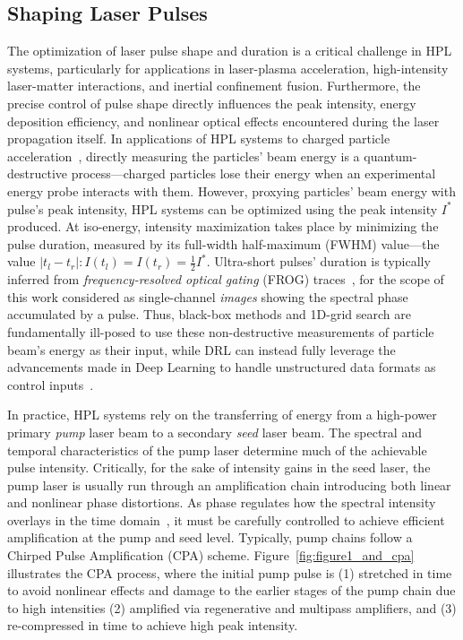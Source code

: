 \subsection{Shaping Laser Pulses}
The optimization of laser pulse shape and duration is a critical challenge in HPL systems, particularly for applications in laser-plasma acceleration, high-intensity laser-matter interactions, and inertial confinement fusion. Furthermore, the precise control of pulse shape directly influences the peak intensity, energy deposition efficiency, and nonlinear optical effects encountered during the laser propagation itself. In applications of HPL systems to charged particle acceleration~\citep{grittani2020device}, directly measuring the particles' beam energy is a quantum-destructive process---charged particles lose their energy when an experimental energy probe interacts with them. 
However, proxying particles' beam energy with pulse's peak intensity, HPL systems can be optimized using the peak intensity $I^*$ produced. At iso-energy, intensity maximization takes place by minimizing the pulse duration, measured by its full-width half-maximum (FWHM) value---the value $\vert t_l - t_r \vert: I(t_l)=I(t_r)= \frac 12 I^*$. Ultra-short pulses' duration is typically inferred from \emph{frequency-resolved optical gating} (FROG) traces~\citep{trebino1993using}, for the scope of this work considered as single-channel \textit{images} showing the spectral phase accumulated by a pulse. Thus, black-box methods and 1D-grid search are fundamentally ill-posed to use these non-destructive measurements of particle beam's energy as their input, while DRL can instead fully leverage the advancements made in Deep Learning to handle unstructured data formats as control inputs~\citep{mnih2013playing}.

In practice, HPL systems rely on the transferring of energy from a high-power primary \textit{pump} laser beam to a secondary \textit{seed} laser beam. The spectral and temporal characteristics of the pump laser determine much of the achievable pulse intensity. Critically, for the sake of intensity gains in the seed laser, the pump laser is usually run through an amplification chain introducing both linear and nonlinear phase distortions. As phase regulates how the spectral intensity overlays in the time domain~\citep{paschotta2008field}, it must be carefully controlled to achieve efficient amplification at the pump and seed level. Typically, pump chains follow a Chirped Pulse Amplification (CPA) scheme. Figure~\ref{fig:figure1_and_cpa} illustrates the CPA process, where the initial pump pulse is (1) stretched in time to avoid nonlinear effects and damage to the earlier stages of the pump chain due to high intensities (2) amplified via regenerative and multipass amplifiers, and (3) re-compressed in time to achieve high peak intensity.

